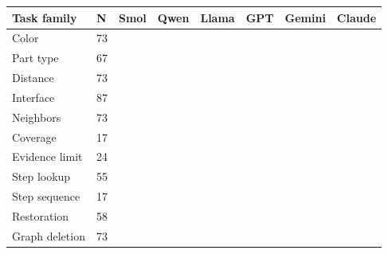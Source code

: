 \begin{tabularx}{\linewidth}{XXrrrrrr}
\toprule
Task family & N & Smol & Qwen & Llama & GPT & Gemini & Claude\\\midrule
Color & 73 &  &  &  &  &  & \\
Part type & 67 &  &  &  &  &  & \\
Distance & 73 &  &  &  &  &  & \\
Interface & 87 &  &  &  &  &  & \\
Neighbors & 73 &  &  &  &  &  & \\
Coverage & 17 &  &  &  &  &  & \\
Evidence limit & 24 &  &  &  &  &  & \\
Step lookup & 55 &  &  &  &  &  & \\
Step sequence & 17 &  &  &  &  &  & \\
Restoration & 58 &  &  &  &  &  & \\
Graph deletion & 73 &  &  &  &  &  & \\
\bottomrule
\end{tabularx}
